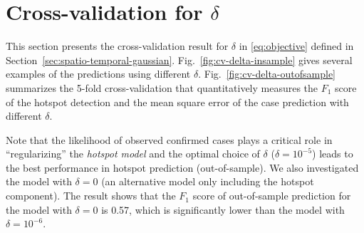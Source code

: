 \documentclass[journal]{IEEEtran}
\begin{document}
\ifCLASSOPTIONcaptionsoff
  \newpage
\fi







%


\clearpage
\newpage

\appendices

\section{Cross-validation for $\delta$}
\label{append:cv-exp-results}

This section presents the cross-validation result for $\delta$ in \eqref{eq:objective} defined in Section~\ref{sec:spatio-temporal-gaussian}. Fig.~\ref{fig:cv-delta-insample} gives several examples of the predictions using different $\delta$. Fig.~\ref{fig:cv-delta-outofsample} summarizes the 5-fold cross-validation that quantitatively measures the $F_1$ score of the hotspot detection and the mean square error of the case prediction with different $\delta$. 

Note that the likelihood of observed confirmed cases plays a critical role in ``regularizing'' the \emph{hotspot model} and the optimal choice of $\delta$ ($\delta=10^{-5}$) leads to the best performance in hotspot prediction (out-of-sample). 
We also investigated the model with $\delta=0$ (an alternative model only including the hotspot component). 
The result shows that the $F_1$ score of out-of-sample prediction for the model with $\delta=0$ is 0.57, which is significantly lower than the model with $\delta=10^{-6}$.
\end{document}
